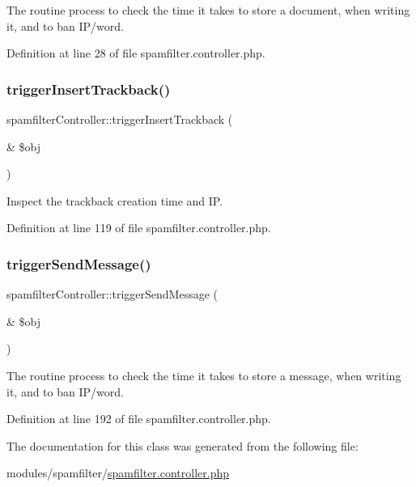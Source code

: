 The routine process to check the time it takes to store a document, when writing it, and to ban I\+P/word. 



Definition at line 28 of file spamfilter.\+controller.\+php.

\mbox{\label{classspamfilterController_ace7cf6178aa16638526af5d73a9554eb}} 
\subsubsection{\texorpdfstring{trigger\+Insert\+Trackback()}{triggerInsertTrackback()}}
{\footnotesize\ttfamily spamfilter\+Controller\+::trigger\+Insert\+Trackback (\begin{DoxyParamCaption}\item[{\&}]{\$obj }\end{DoxyParamCaption})}



Inspect the trackback creation time and IP. 



Definition at line 119 of file spamfilter.\+controller.\+php.

\mbox{\label{classspamfilterController_ab449e4ff64d26ae0ad3660522dbd396f}} 
\subsubsection{\texorpdfstring{trigger\+Send\+Message()}{triggerSendMessage()}}
{\footnotesize\ttfamily spamfilter\+Controller\+::trigger\+Send\+Message (\begin{DoxyParamCaption}\item[{\&}]{\$obj }\end{DoxyParamCaption})}



The routine process to check the time it takes to store a message, when writing it, and to ban I\+P/word. 



Definition at line 192 of file spamfilter.\+controller.\+php.



The documentation for this class was generated from the following file\+:\begin{DoxyCompactItemize}
\item 
modules/spamfilter/\hyperlink{spamfilter_8controller_8php}{spamfilter.\+controller.\+php}\end{DoxyCompactItemize}
